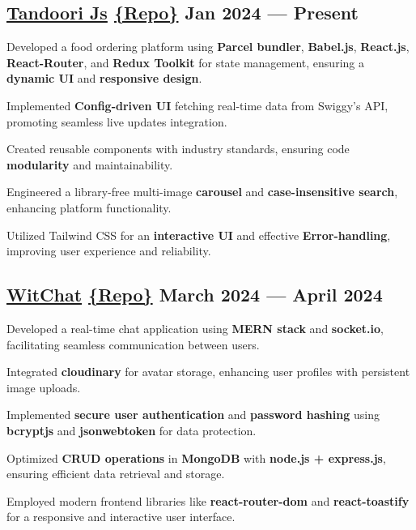 \subsection{\href{https://tandoori-js.vercel.app}{Tandoori Js} \href{https://github.com/thekiranmahajan/tandoori-js}{\{Repo\}} \hfill Jan 2024 --- Present}
\begin{zitemize}
\item Developed a food ordering platform using \textbf{Parcel bundler}, \textbf{Babel.js}, \textbf{React.js}, \textbf{React-Router}, and \textbf{Redux Toolkit} for state management, ensuring a \textbf{dynamic UI} and \textbf{responsive design}.
\item Implemented \textbf{Config-driven UI} fetching real-time data from Swiggy's API, promoting seamless live updates integration.
\item Created reusable components with industry standards, ensuring code \textbf{modularity} and maintainability.
\item Engineered a library-free multi-image \textbf{carousel} and \textbf{case-insensitive search}, enhancing platform functionality.
\item Utilized Tailwind CSS for an \textbf{interactive UI} and effective \textbf{Error-handling}, improving user experience and reliability.
\end{zitemize}

\subsection{\href{http://wit-chat.onrender.com/}{WitChat} \href{https://github.com/thekiranmahajan/wit-chat}{\{Repo\}} \hfill March 2024 --- April 2024}
\begin{zitemize}
\item Developed a real-time chat application using \textbf{MERN stack} and \textbf{socket.io}, facilitating seamless communication between users.
\item Integrated \textbf{cloudinary} for avatar storage, enhancing user profiles with persistent image uploads.
\item Implemented \textbf{secure user authentication} and \textbf{password hashing} using \textbf{bcryptjs} and \textbf{jsonwebtoken} for data protection.
\item Optimized \textbf{CRUD operations} in \textbf{MongoDB} with \textbf{node.js + express.js}, ensuring efficient data retrieval and storage.
\item Employed modern frontend libraries like \textbf{react-router-dom} and \textbf{react-toastify} for a responsive and interactive user interface.
\end{zitemize}

